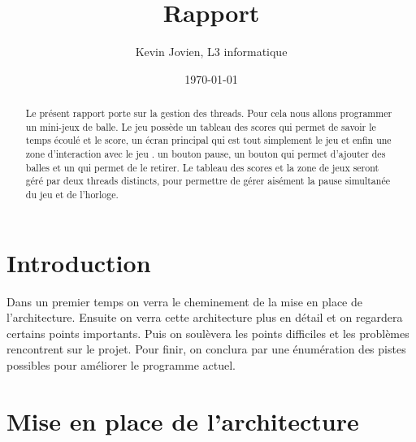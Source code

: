 \documentclass{article}
\title{Rapport}
\author{Kevin Jovien, L3 informatique}
\date{\today}
\begin{document}
\maketitle %


\begin{abstract}
  Le présent rapport porte sur la gestion des threads. Pour cela nous allons programmer un mini-jeux de balle. Le jeu possède un tableau des scores qui permet de savoir le temps écoulé et le score, un écran principal qui est tout simplement le jeu et enfin une zone d’interaction avec le jeu . un bouton pause, un bouton qui permet d’ajouter des balles et un qui permet de le retirer. Le tableau des scores et la zone de jeux seront géré par deux threads distincts, pour permettre de gérer aisément la pause simultanée du jeu et de l’horloge. 
\end{abstract}
\section{Introduction}
\label{section:intro} %

Dans un premier temps on verra le cheminement de la mise en place de l’architecture. Ensuite on verra cette architecture plus en détail et on regardera certains points importants. Puis on soulèvera les points difficiles et les problèmes rencontrent sur le projet. Pour finir, on conclura par une énumération des pistes possibles pour améliorer le programme actuel.

\section{Mise en place de l'architecture}
\label{section:corps} %
\end{document}
